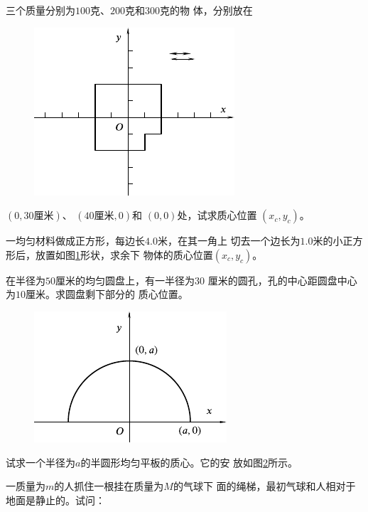 \clearpage
\begin{exercises}

\exercise 三个质量分别为$ 100 $克、$ 200 $克和$ 300 $克的物
体，分别放在
\begin{figure}
  \centering
  \includegraphics{figure/fig08.10}
  \caption{}
  \label{fig:08.10}
\end{figure}
$ \left(0, 30 \text {厘米} \right) $、
$ \left(40 \text{厘米}, 0 \right) $和
$ \left(0, 0 \right) $处，试求质心位置
$ \left( x _ { c } , y _ { c } \right) $。

\exercise 一均匀材料做成正方形，每边长$ 4.0 $米，在其一角上
切去一个边长为$ 1.0 $米的小正方形后，放置如图\ref{fig:08.10}形状，求余下
物体的质心位置$ \left( x _ { c } , y _ { c } \right) $。

\exercise 在半径为$ 50 $厘米的均匀圆盘上，有一半径为$ 30 $
厘米的圆孔，孔的中心距圆盘中心为$ 10 $厘米。求圆盘剩下部分的
质心位置。

\begin{figure}
  \centering
  \includegraphics{figure/fig08.11}
  \caption{}
  \label{fig:08.11}
\end{figure}
\exercise 试求一个半径为$ a $的半圆形均匀平板的质心。它的安
放如图\ref{fig:08.11}所示。

\exercise 一质量为$ m $的人抓住一根挂在质量为$ M $的气球下
面的绳梯，最初气球和人相对于地面是静止的。试问：


\end{exercises}
